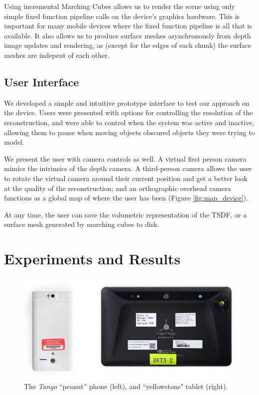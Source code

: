 \documentclass[conference,10pt]{IEEEtran}
\begin{document}
Using incremental Marching Cubes allows us to render the scene using only simple
fixed function pipeline calls on the device's graphics hardware. This is
important for many mobile devices where the fixed function pipeline is all that
is available. It also allows us to produce surface meshes asynchronously from
depth image updates and rendering, as (except for the edges of  each chunk) the
surface meshes are indepent of each other.

\subsection{User Interface}
We developed a simple and intuitive prototype interface to test our approach on
the device. Users were presented with options for controlling the resolution of
the reconstruction, and were able to control when the system was active and
inactive, allowing them to pause when moving objects obscured objects they were
trying to model.

We present the user with camera controls as well. A virtual first person
camera mimics the intrinsics of the depth camera. A third-person camera allows
the user to rotate the virtual camera around their current position and get a
better look at the quality of the reconstruction; and an orthographic overhead
camera functions as a global map of where the user has been (Figure
\ref{fig:map_device}).

At any time, the user can save the volumetric representation of the TSDF, or a
surface mesh generated by marching cubes to disk.

\section{Experiments and Results}
\begin{figure}[t]
  \centering
    \includegraphics[width=1.0\columnwidth]{img/devices}
      \caption{The \textit{Tango}\cite{Tango} ``peanut'' phone (left), and
      ``yellowstone" tablet (right).}
  \label{fig:devices}
\end{figure}
\end{document}
